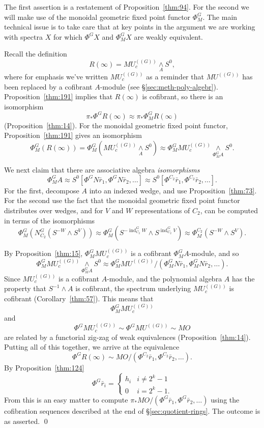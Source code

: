 \documentclass{amsart}
\theoremstyle{definition}
\theoremstyle{remark}
\newenvironment{pf}{\bigskip{\em Proof:\/}}{\qed\medskip}
\newcommand{\mutn}[1]{MU^{(\!(#1)\!)}}
\newcommand{\smashove}[1]{\underset{#1}{\wedge}}
\newcommand{\norm}{N}
\newcommand{\gfp}[1]{\Phi^{#1}}
\newcommand{\gfpm}[1]{\Phi_{M}^{#1}}
\newcommand{\phig}{\gfp{G}}
\newcommand{\phizt}{\gfp{\zt}}
\newcommand{\phiztm}{\gfpm{\zt}}
\newcommand{\phigm}{\gfpm{G}}
\DeclareMathOperator{\ind}{ind}
\newcommand{\gbar}{\bar}
\newcommand{\uc}{h}
\newcommand{\rr}{\gbar{r}}
\newcommand{\zt}{C_{2}}
\begin{document}
\begin{pf}
The first assertion is a restatement of Proposition~\ref{thm:94}.  For
the second we will make use of the monoidal geometric fixed point
functor $\phigm$.  The main technical issue is to take care that at
key points in the argument we are working with spectra $X$ for which
$\phig X$ and $\phigm X$ are weakly equivalent.

Recall the definition
\[
R(\infty)=\mutn{G}_{c}\smashove{A}S^{0},
\]
where for emphasis we've written $\mutn{G}_{c}$ as a reminder that
$\mutn{G}$ has been replaced by a cofibrant $A$-module (see
\S\ref{sec:meth-poly-algebr}).  Proposition~\ref{thm:191} implies that
$R(\infty)$ is cofibrant, so there is an isomorphism
\[
\pi_{\ast}\phig R(\infty)\approx \pi_{\ast}\phigm R(\infty)
\]
(Proposition~\ref{thm:14}).  For the monoidal geometric fixed point
functor, Proposition~\ref{thm:191} gives an isomorphism
\[
\phigm(R(\infty))=\phigm(\mutn{G}_{c}\smashove{A}S^{0})\approx \phigm\mutn{G}_{c}
\smashove{\phigm A} S^{0}.
\]

We next claim that there are associative algebra {\em isomorphisms}
\[
\phigm A\approx
S^{0}[\phig \norm \gbar{r}_{1},\phig \norm\gbar{r}_{2},\dots]\approx
S^{0}[\phizt \gbar r_{1},\phizt \gbar r_{2},\dots].  
\]
For the first, decompose $A$ into an indexed wedge, and use
Proposition~\ref{thm:73}.  For the second use the fact that the
monoidal geometric fixed point functor distributes over wedges, and
for $V$ and $W$ representations of $\zt$, can be computed in terms of
the isomorphisms
\[
\phigm(\norm_{\zt}^{G}(S^{-W}\wedge S^{V})) \approx \phigm
(S^{-\ind_{\zt}^{G}W}\wedge S^{\ind_{\zt}^{G}V}) \approx \phiztm
(S^{-W}\wedge S^{V}).
\]

By Proposition~\ref{thm:15}, $\phigm\mutn{G}_{c}$ is a cofibrant
$\phigm A$-module, and so
\[
\phigm\mutn{G}_{c}
\smashove{\phigm A} S^{0}\approx 
\phigm\mutn{G}/(\phigm\norm \gbar r_{1},\phigm\norm \gbar r_{2},\dots).
\]
Since $\mutn{G}_{c}$ is a cofibrant $A$-module, and the polynomial
algebra $A$ has the property that $S^{-1}\wedge A$ is cofibrant, the
spectrum underlying $\mutn{G}_{c}$ is cofibrant
(Corollary~\ref{thm:57}).  This means that
\[
\phigm \mutn{G}_{c} 
\]
and
\[
\phig\mutn{G}_{c}\sim \phig\mutn{G}\sim MO
\]
are related by a functorial zig-zag of weak equivalences
(Proposition~\ref{thm:14}).  Putting all of this together, we arrive
at the equivalence
\[
\phig R(\infty) \sim MO/(\phizt \gbar r_{1},\phizt \gbar r_{2},\dots).
\]
By Proposition~\ref{thm:124}
\[
\phig \rr_{i} = \begin{cases}
\uc_{i} & i\ne 2^{k}-1 \\
0 & i=2^{k}-1.
\end{cases}
\]
From this is an easy matter to compute $\pi_{\ast}MO/(\phig \gbar
r_{1},\phig \gbar r_{2},\dots)$ using the cofibration sequences
described at the end of \S\ref{sec:quotient-rings}.  The outcome is as
asserted.
\end{pf}
\end{document}
